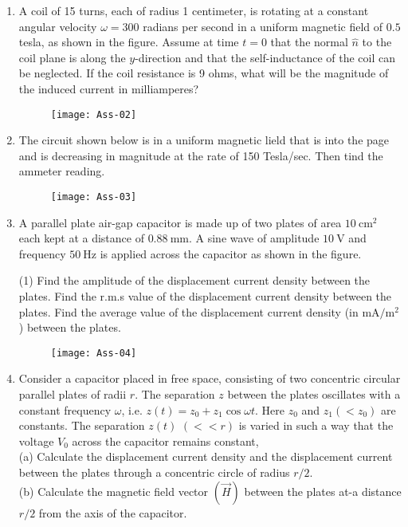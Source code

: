 \begin{enumerate}
\begin{figure}[H]
	\end{figure}
	Find an expression for the $x$-component of the force $\vec{F}$ acting on the loop in terms of its velocity $\vec{v}(t), B, L$ and $R$.
	\item A coil of 15 turns, each of radius 1 centimeter, is rotating at a constant angular velocity $\omega=300$ radians per second in a uniform magnetic field of $0.5$ tesla, as shown in the figure. Assume at time $t=0$ that the normal $\hat{n}$ to the coil plane is along the $y$-direction and that the self-inductance of the coil can be neglected. If the coil resistance is 9 ohms, what will be the magnitude of the induced current in milliamperes?
	\begin{figure}[H]
		\centering
		\texttt{[image: Ass-02]}
	\end{figure}
	\item The circuit shown below is in a uniform magnetic lield that is into the page and is decreasing in magnitude at the rate of 150 Tesla/sec. Then tind the ammeter reading.
	\begin{figure}[H]
		\centering
		\texttt{[image: Ass-03]}
	\end{figure}
	\item A parallel plate air-gap capacitor is made up of two plates of area $10 \mathrm{~cm}^{2}$ each kept at a distance of $0.88 \mathrm{~mm}$. A sine wave of amplitude $10 \mathrm{~V}$ and frequency $50 \mathrm{~Hz}$ is applied across the capacitor as shown in the figure.
	\begin{tasks}(1)
		\task[\textbf{a.}]Find the amplitude of the displacement current density between the plates.
		\task[\textbf{b.}]
		 Find the r.m.s value of the displacement current density between the plates.
		\task[\textbf{c.}]Find the average value of the displacement current density (in $\mathrm{mA} / \mathrm{m}^{2}$ ) between the plates.
	\end{tasks}
	\begin{figure}[H]
		\centering
		\texttt{[image: Ass-04]}
	\end{figure}
	\item Consider a capacitor placed in free space, consisting of two concentric circular parallel plates of radii $r$. The separation $z$ between the plates oscillates with a constant frequency $\omega$, i.e. $z(t)=z_{0}+z_{1} \cos \omega t$. Here $z_{0}$ and $z_{1}\left(<z_{0}\right)$ are constants. The separation $z(t)$ $(<<r)$ is varied in such a way that the voltage $V_{0}$ across the capacitor remains constant,\\
	(a) Calculate the displacement current density and the displacement current between the plates through a concentric circle of radius $r / 2$.\\
	(b) Calculate the magnetic field vector $(\vec{H})$ between the plates at-a distance $r / 2$ from the axis of the capacitor.
\end{enumerate}

